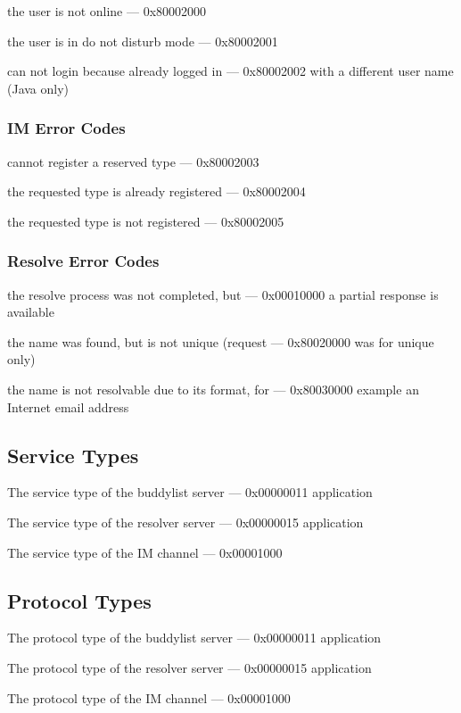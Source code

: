 \documentclass[titlepage,oneside]{book}
\begin{document}
the user is not online                            --- 0x80002000

the user is in do not disturb mode                --- 0x80002001

can not login because already logged in           --- 0x80002002
with a different user name (Java only)

\subsubsection{IM Error Codes}

cannot register a reserved type                   --- 0x80002003

the requested type is already registered          --- 0x80002004

the requested type is not registered              --- 0x80002005

\subsubsection{Resolve Error Codes}

the resolve process was not completed, but        --- 0x00010000
a partial response is available

the name was found, but is not unique (request    --- 0x80020000
was for unique only)

the name is not resolvable due to its format, for --- 0x80030000
example an Internet email address

\subsection{Service Types}

The service type of the buddylist server          --- 0x00000011
application

The service type of the resolver server           --- 0x00000015
application

The service type of the IM channel                --- 0x00001000

\subsection{Protocol Types}

The protocol type of the buddylist server         --- 0x00000011
application

The protocol type of the resolver server          --- 0x00000015
application

The protocol type of the IM channel               --- 0x00001000
\end{document}
